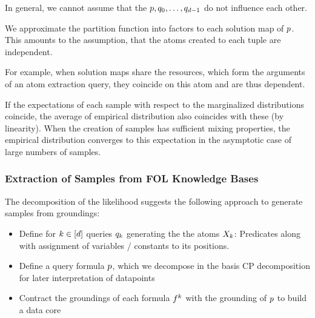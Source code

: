 In general, we cannot assume that the $p,q_{0},\ldots,q_{d-1}$ do not influence each other.

We approximate the partition function into factors to each solution map of $p$.
This amounts to the assumption, that the atoms created to each tuple are independent.

%
For example, when solution maps share the resources, which form the arguments of an atom extraction query, they coincide on this atom and are thus dependent.

% 
If the expectations of each sample with respect to the marginalized distributions coincide, the average of empirical distribution also coincides with these (by linearity).
When the creation of samples has sufficient mixing properties, the empirical distribution converges to this expectation in the asymptotic case of large numbers of samples.

% 









\subsubsection{Extraction of Samples from FOL Knowledge Bases}

The decomposition of the likelihood suggests the following approach to generate samples from groundings:
\begin{itemize}
	\item Define for $k\in[d]$ queries $q_{k}$ generating the the atoms $X_{k}$: 
	Predicates along with assignment of variables / constants to its positions.
	\item Define a query formula $p$, which we decompose in the basis CP decomposition for later interpretation of datapoints
	\item Contract the groundings of each formula $f^{k}$ with the grounding of $p$ to build a data core
\end{itemize}









